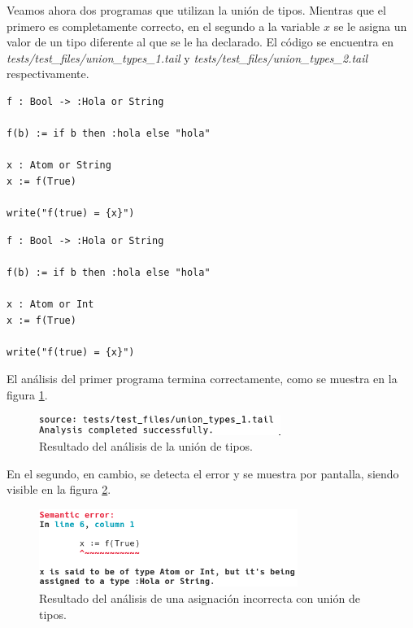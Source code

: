 Veamos ahora dos programas que utilizan la unión de tipos. Mientras que el primero es completamente correcto, en el segundo a la variable $x$ se le asigna un valor de un tipo diferente al que se le ha declarado. El código se encuentra en \textit{tests/test\_files/union\_types\_1.tail} y \textit{tests/test\_files/union\_types\_2.tail} respectivamente.\\

\begin{lstlisting}[style=tail]
f : Bool -> :Hola or String

f(b) := if b then :hola else "hola"

x : Atom or String
x := f(True)

write("f(true) = {x}")
\end{lstlisting}

\begin{lstlisting}[style=tail]
f : Bool -> :Hola or String

f(b) := if b then :hola else "hola"

x : Atom or Int
x := f(True)

write("f(true) = {x}")
\end{lstlisting}

El análisis del primer programa termina correctamente, como se muestra en la figura \ref{fig:un1}.

\begin{figure}[H]
	\begin{center}
		\includegraphics[width=0.7\textwidth]{imagenes/union1.png}
		\caption{Resultado del análisis de la unión de tipos.}
		\label{fig:un1}
	\end{center}
\end{figure}

En el segundo, en cambio, se detecta el error y se muestra por pantalla, siendo visible en la figura \ref{fig:un2}.\\

\begin{figure}[H]
	\begin{center}
		\includegraphics[width=0.75\textwidth]{imagenes/union2.png}
		\caption{Resultado del análisis de una asignación incorrecta con unión de tipos.}
		\label{fig:un2}
	\end{center}
\end{figure}


